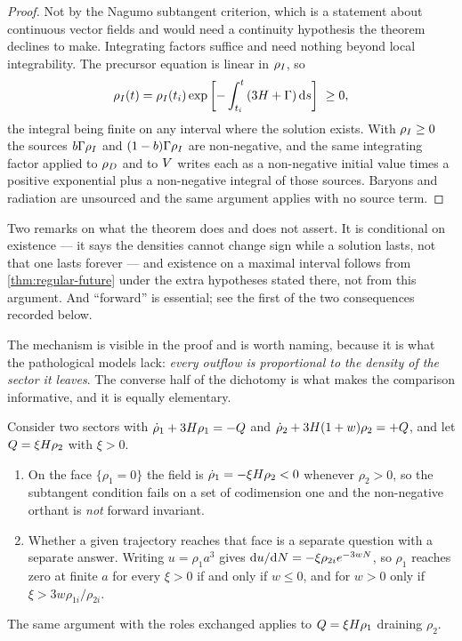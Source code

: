 \begin{proof}
  Not by the Nagumo subtangent criterion, which is a statement about continuous
  vector fields and would need a continuity hypothesis the theorem declines to
  make. Integrating factors suffice and need nothing beyond local
  integrability. The precursor equation is linear in $\rho_{I}$, so
  \begin{equation*}
    \rho_{I}(t)=\rho_{I}(t_i)\exp\left[-\int_{t_i}^{t}\left(3H+\Gamma\right)\mathrm{d} s
    \right]\ \ge 0 ,
  \end{equation*}
  the integral being finite on any interval where the solution exists. With
  $\rho_{I}\ge0$ the sources $b\Gamma\rho_{I}$ and $(1-b)\Gamma\rho_{I}$ are
  non-negative, and the same integrating factor applied to $\rho_{D}$ and to
  $V$ writes each as a non-negative initial value times a positive
  exponential plus a non-negative integral of those sources. Baryons and
  radiation are unsourced and the same argument applies with no source term.
\end{proof}

Two remarks on what the theorem does and does not assert. It is conditional on
existence --- it says the densities cannot change sign while a solution lasts,
not that one lasts forever --- and existence on a maximal interval follows from
\cref{thm:regular-future} under the extra hypotheses stated there, not from
this argument. And ``forward'' is essential; see the first of the two
consequences recorded below.

The mechanism is visible in the proof and is worth naming, because it is what
the pathological models lack: \emph{every outflow is proportional to the
density of the sector it leaves}. The converse half of the dichotomy is what
makes the comparison informative, and it is equally elementary.

\begin{proposition}
  \label{prop:recipient-proportional}
  Consider two sectors with $\dot\rho_1+3H\rho_1=-Q$ and
  $\dot\rho_2+3H(1+w)\rho_2=+Q$, and let $Q=\xi H\rho_2$ with $\xi>0$.
  \begin{enumerate}
    \item On the face $\{\rho_1=0\}$ the field is
      $\dot\rho_1=-\xi H\rho_2<0$ whenever $\rho_2>0$, so the subtangent
      condition fails on a set of codimension one and the non-negative orthant
      is \emph{not} forward invariant.
    \item Whether a given trajectory reaches that face is a separate question
      with a separate answer. Writing $u=\rho_1a^3$ gives
      $\mathrm{d} u/\mathrm{d} N=-\xi\rho_{2i}e^{-3w N}$, so $\rho_1$ reaches zero
      at finite $a$ for every $\xi>0$ if and only if $w\le0$, and for $w>0$ only
      if $\xi>3w\rho_{1i}/\rho_{2i}$.
  \end{enumerate}
  The same argument with the roles exchanged applies to $Q=\xi H\rho_1$
  draining $\rho_2$.
\end{proposition}

